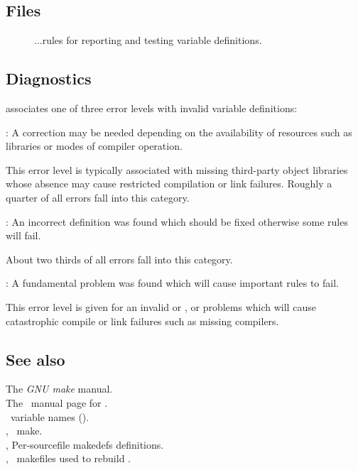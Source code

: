 \subsection*{Files}
 
\begin{description}
\item[]
...rules for reporting and testing variable definitions.
\end{description}

\subsection*{Diagnostics}
 
 associates one of three error levels with invalid variable
definitions:

\begin{description}
\item
   : A correction may be needed depending on the availability
   of resources such as libraries or modes of compiler operation.

   This error level is typically associated with missing third-party object
   libraries whose absence may cause restricted compilation or link failures.
   Roughly a quarter of all errors fall into this category.

\item
   : An incorrect definition was found which should be fixed
   otherwise some rules will fail.

   About two thirds of all errors fall into this category.

\item
   : A fundamental problem was found which will cause important
   rules to fail.

   This error level is given for an invalid  or ,
   or problems which will cause catastrophic compile or link failures such as
   missing compilers.
\end{description}

\noindent
 
\subsection*{See also}
 
The \textit{GNU make} manual.\\
The \gnu\ manual page for .\\
\aipspp\ variable names ().\\
, \gnu\ make.\\
, Per-sourcefile makedefs definitions.\\
, \gnu\ makefiles used to rebuild \aipspp.
 
